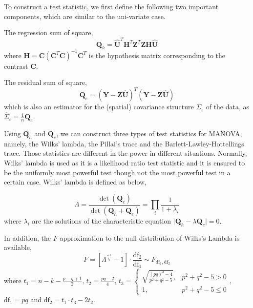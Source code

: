 To construct a test statistic, we first define the following two important
components, which are similar to the uni-variate case.

The regression sum of square, 
\begin{equation}
\boldsymbol{Q}_{h}=\hat{\boldsymbol{U}}^{T}\boldsymbol{H}^{T}\boldsymbol{Z}^{T}\boldsymbol{Z}\boldsymbol{H}\hat{\boldsymbol{U}}\label{eq:MANOVAQh}
\end{equation}
where $\boldsymbol{H}=\boldsymbol{C}\left(\boldsymbol{C}^{T}\boldsymbol{C}\right)^{-1}\boldsymbol{C}^{T}$
is the hypothesis matrix corresponding to the contrast $\boldsymbol{C}$.

The residual sum of square,
\begin{equation}
\boldsymbol{Q}_{e}=\left(\boldsymbol{Y}-\boldsymbol{Z}\hat{\boldsymbol{U}}\right)^{T}\left(\boldsymbol{Y}-\boldsymbol{Z}\hat{\boldsymbol{U}}\right)\label{eq:MANOVAQe}
\end{equation}
which is also an estimator for the (spatial) covariance structure
$\Sigma_{\epsilon}$ of the data, as $\hat{\Sigma}_{\epsilon}=\frac{1}{n}\boldsymbol{Q}_{e}$.

Using $\boldsymbol{Q}_{h}$ and $\boldsymbol{Q}_{e}$, we can construct
three types of test statistics for MANOVA, namely, the Wilks' lambda,
the Pillai's trace and the Barlett-Lawley-Hottellings trace. Those
statistics are different in the power in different situations. Normally,
Wilks' lambda is used as it is a likelihood ratio test statistic and
it is ensured to be the uniformly most powerful test though not the
most powerful test in a certain case. Wilks' lambda is defined as
below,

\begin{equation}
\Lambda=\frac{\det\left(\boldsymbol{Q}_{e}\right)}{\det\left(\boldsymbol{Q}_{h}+\boldsymbol{Q}_{e}\right)}=\prod_{i}\frac{1}{1+\lambda_{i}}
\end{equation}
where $\lambda_{i}$ are the solutions of the characteristic equation
$\mid\boldsymbol{Q}_{h}-\lambda\boldsymbol{Q}_{e}\mid=0$.

In addition, the $F$ approximation \cite{rao1951asymptotic} to the
null distribution of Wilks's Lambda is available, 
\[
F=\left[\Lambda^{\frac{-1}{t_{3}}}-1\right]\cdot\frac{\text{df}_{2}}{\text{df}_{1}}\sim F_{\text{df}_{1},\text{df}_{2}}
\]
where $t_{1}=n-k-\frac{p-q+1}{2}$, $t_{2}=\frac{pq-2}{4}$, $t_{3}=\begin{cases}
\sqrt{\frac{\left(pq\right)^{2}-4}{p^{2}+q^{2}-5}}, & p^{2}+q^{2}-5>0\\
1, & p^{2}+q^{2}-5\le0
\end{cases}$, $\text{df}_{1}=pq$ and $\text{df}_{2}=t_{1}\cdot t_{3}-2t_{2}$. 

